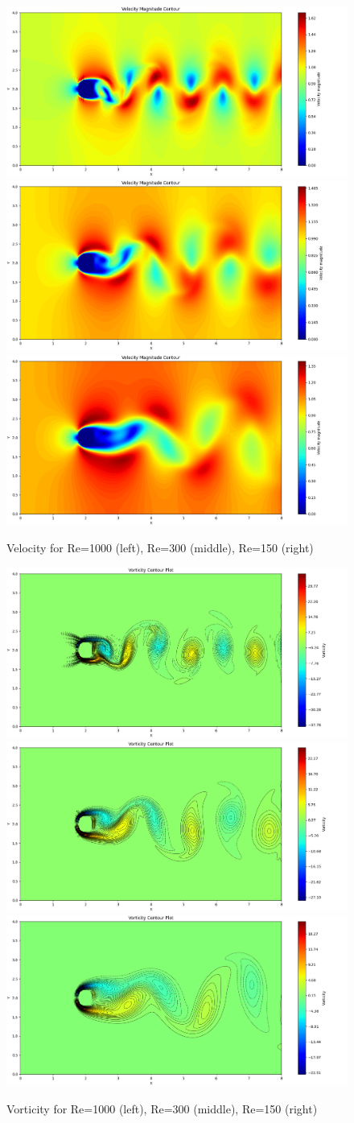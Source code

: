 \documentclass[12pt]{article}
\begin{document}
\begin{figure}[H]
    \centering
    \includegraphics[width=0.3\linewidth]{figure/N32_Re1000_8x4_t100/v_N32_Re1000_8x4_t100.jpg}
    \includegraphics[width=0.3\linewidth]{figure/N32_Re300_8x4_t100/v_N32_Re300_8x4_t100.jpg}
    \includegraphics[width=0.3\linewidth]{figure/N32_Re150_8x4_t100/v_N32_Re150_8x4_t100.jpg}
    \caption{Velocity for Re=1000 (left), Re=300 (middle), Re=150 (right) }
\end{figure}



\begin{figure}[H]
    \centering
    \includegraphics[width=0.3\linewidth]{figure/N32_Re1000_8x4_t100/vor_N32_Re1000_8x4_t100.jpg}
    \includegraphics[width=0.3\linewidth]{figure/N32_Re300_8x4_t100/vor_N32_Re300_8x4_t100.jpg}
    \includegraphics[width=0.3\linewidth]{figure/N32_Re150_8x4_t100/vor_N32_Re150_8x4_t100.jpg}
    \caption{Vorticity for Re=1000 (left), Re=300 (middle), Re=150 (right)}
\end{figure}
\end{document}
